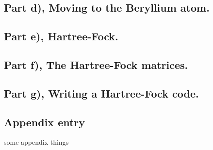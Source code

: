 \documentclass{article}
\begin{document}
\subsection*{Part d), Moving to the Beryllium atom.}
\subsection*{Part e), Hartree-Fock.}
\subsection*{Part f), The Hartree-Fock matrices.}
\subsection*{Part g), Writing a Hartree-Fock code.}


\begin{appendix}
    \section{Appendix entry}
    some appendix things
\end{appendix}
\cite{DFTgap}
\printbibliography
\end{document}
